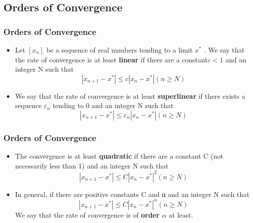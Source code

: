 \documentclass[notheorems,mathserif,table,compress]{beamer}  %
\begin{document}
\subsection{Orders of Convergence} 
\begin{frame}
  \frametitle{Orders of Convergence}
  \begin{itemize}
  \item Let $[ x_n ]$ be a sequence of real numbers tending to a limit $x^*$ . We say
that the rate of convergence is at least \textbf{linear} if there are a constant$ c < 1$ and an
integer N such that   
\begin{displaymath}
 |x_{n+1}-x^*|\leq  c|x_n-x^*|   (n\geq  N)
\end{displaymath}

  \item   We say that the rate of convergence is at least \textbf{superlinear} if there exists a sequence
$\varepsilon_{n}$ tending to 0 and an integer N such that  
\begin{displaymath}
|x_{n+1}-x^*|\leq  \varepsilon_n|x_n-x^*|  (n\geq  N)
\end{displaymath}
  \end{itemize}
  
\end{frame}

\begin{frame}
  \frametitle{Orders of Convergence}
 \begin{itemize}
\item The convergence is at least \textbf{quadratic} if there are a constant C (not necessarily less
than 1) and an integer N such that    
\begin{displaymath}
|x_{n+1}-x^*|\leq  C|x_n-x^*|^2  (n\geq  N)
\end{displaymath}
 
\item In general, if there are positive constants C and α and an integer N such that 
\begin{displaymath}
 |x_{n+1}-x^*|\leq  C|x_n-x^*|^\alpha  (n\geq  N)
\end{displaymath}
 We say that the rate of convergence is of \textbf{order $\alpha$}  at least.
  \end{itemize}

\end{frame}
\end{document}
